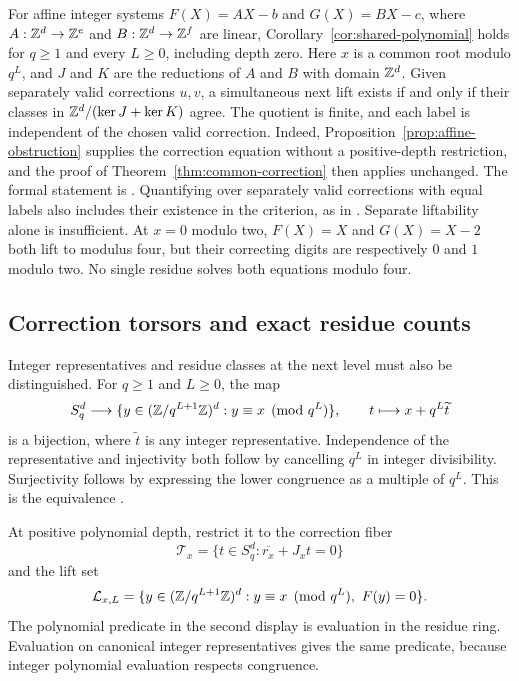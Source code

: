 For affine integer systems $F(X)=AX-b$ and $G(X)=BX-c$, where
$A:\mathbb Z^d\to\mathbb Z^e$ and $B:\mathbb Z^d\to\mathbb Z^f$ are linear,
Corollary~\ref{cor:shared-polynomial} holds for $q\ge1$ and every
$L\ge0$, including depth zero. Here $x$ is a common root modulo $q^L$,
and $J$ and $K$ are the reductions of $A$ and $B$ with domain $\mathbb Z^d$.
Given separately valid corrections $u,v$, a simultaneous next lift exists
if and only if their classes in $\mathbb Z^d/(\ker J+\ker K)$ agree. The quotient
is finite, and each label is independent of the chosen valid correction.
Indeed, Proposition~\ref{prop:affine-obstruction} supplies the correction
equation without a positive-depth restriction, and the proof of
Theorem~\ref{thm:common-correction} then applies unchanged. The formal
statement is .
Quantifying over separately valid corrections with equal labels also
includes their existence in the criterion, as in
.
Separate liftability alone is insufficient. At $x=0$ modulo two,
$F(X)=X$ and $G(X)=X-2$ both lift to modulus four, but their correcting
digits are respectively $0$ and $1$ modulo two. No single residue solves
both equations modulo four.

\subsection{Correction torsors and exact residue counts}

Integer representatives and residue classes at the next level must also be
distinguished. For $q\ge1$ and $L\ge0$, the map
\[
 S_q^d\longrightarrow
 \{y\in(\mathbb Z/q^{L+1}\mathbb Z)^d:y\equiv x\pmod{q^L}\},
 \qquad t\longmapsto x+q^L\widetilde t
\]
is a bijection, where $\widetilde t$ is any integer representative.
Independence of the representative and injectivity both follow by cancelling
$q^L$ in integer divisibility. Surjectivity follows by expressing the lower
congruence as a multiple of $q^L$. This is the equivalence
.

At positive polynomial depth, restrict it to the correction fiber
\[
 \mathcal T_x=\{t\in S_q^d:\overline{r_x}+J_xt=0\}
\]
and the lift set
\[
 \mathcal L_{x,L}=
 \{y\in(\mathbb Z/q^{L+1}\mathbb Z)^d:y\equiv x\pmod{q^L},\ F(y)=0\}.
\]
The polynomial predicate in the second display is evaluation in the residue
ring. Evaluation on canonical integer representatives gives the same
predicate, because integer polynomial evaluation respects congruence.

